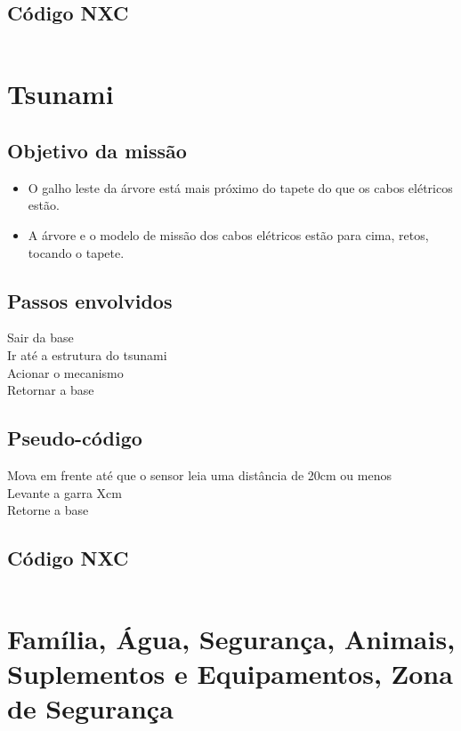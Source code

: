 \documentclass{article}
\begin{document}
	\subsection{Código NXC}
		\inputminted[linenos, frame = single]{c}{../GalhoArvore.nxc}

\newpage
\section{Tsunami}
	\subsection{Objetivo da missão}
		\begin{itemize}
			\item O galho leste da árvore está mais próximo do tapete do que os cabos elétricos estão.
			\item A árvore e o modelo de missão dos cabos elétricos estão para cima, retos, tocando o tapete.
		\end{itemize}

	\subsection{Passos envolvidos}
		Sair da base\\
		Ir até a estrutura do tsunami\\
		Acionar o mecanismo\\
		Retornar a base\\

	\subsection{Pseudo-código}
		Mova em frente até que o sensor leia uma distância de 20cm ou menos\\
		Levante a garra Xcm\\
		Retorne a base\\

	\subsection{Código NXC}
		\inputminted[linenos, frame = single]{c}{../Ondas.nxc}

\newpage
\section{Família, Água, Segurança, Animais, Suplementos e Equipamentos, Zona de Segurança}
\end{document}

